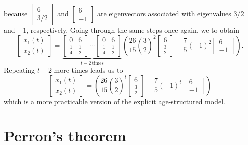\documentclass[../book.tex]{subfiles}
\begin{document}
because \(\begin{bmatrix} 6 \\ 3/2\end{bmatrix}\) and \(\begin{bmatrix} 6 \\ -1\end{bmatrix}\) are eigenvectors associated with eigenvalues \(3/2\) and \(-1\), respectively. Going through the same steps once again, we to obtain
\begin{equation}\label{eq:eig-42}
\begin{bmatrix}
  x_1 (t) \\ x_2(t)
\end{bmatrix}
=
\underbrace{
  \begin{bmatrix}
    0 & 6 \\ \frac{1}{4} & \frac{1}{2}
  \end{bmatrix}
  \cdots
  \begin{bmatrix}
    0 & 6 \\ \frac{1}{4} & \frac{1}{2}
  \end{bmatrix}
}_{t-2\ \text{times}}
\left(
  \frac{26}{15}  
  \left(\frac{3}{2}\right)^2  
  \begin{bmatrix}
    6 \\ \frac{3}{2}
  \end{bmatrix}
  -
  \frac{7}{5} 
  (-1)^2 
  \begin{bmatrix}
    6 \\ - 1
  \end{bmatrix}
\right).
\end{equation}
Repeating \(t-2\) more times leads us to
\begin{equation}\label{eq:eig-43}
\begin{bmatrix}
  x_1 (t) \\ x_2(t)
\end{bmatrix}
=
\left(
  \frac{26}{15}  
  \left(\frac{3}{2}\right)^t  
  \begin{bmatrix}
    6 \\ \frac{3}{2}
  \end{bmatrix}
  -
  \frac{7}{5} 
  (-1)^t 
  \begin{bmatrix}
    6 \\ - 1
  \end{bmatrix}
\right)
\end{equation}
which is a more practicable version of the explicit age-structured model.

\section{Perron's theorem}
\end{document}
